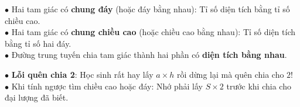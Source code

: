 \documentclass[14pt,a4paper,oneside]{extbook}
\begin{document}
\noindent
\begin{minipage}[t]{0.54\textwidth}
  \begin{tcolorbox}[
    enhanced,
    title={\footnotesize\bfseries\color{white}\faBolt\ Tính chất tỉ số diện tích tam giác},
    colback=green!3!white,
    colframe=green!60!black,
    arc=2.5mm, boxrule=0.8pt, top=1.8mm, bottom=1.8mm, left=2.2mm, right=2.2mm
  ]
    \footnotesize
    $\bullet$ Hai tam giác có \textbf{chung đáy} (hoặc đáy bằng nhau): Tỉ số diện tích bằng tỉ số chiều cao.\\
    $\bullet$ Hai tam giác có \textbf{chung chiều cao} (hoặc chiều cao bằng nhau): Tỉ số diện tích bằng tỉ số hai đáy.\\
    $\bullet$ Đường trung tuyến chia tam giác thành hai phần có \textbf{diện tích bằng nhau}.
  \end{tcolorbox}
\end{minipage}%
\hfill
\begin{minipage}[t]{0.44\textwidth}
  \begin{tcolorbox}[
    enhanced,
    title={\footnotesize\bfseries\color{white}\faExclamationTriangle\ Mẹo tránh bẫy trắc nghiệm},
    colback=red!2!white,
    colframe=red!70!black,
    arc=2.5mm, boxrule=0.8pt, top=1.8mm, bottom=1.8mm, left=2.2mm, right=2.2mm
  ]
    \footnotesize
    $\bullet$ \textbf{Lỗi quên chia 2}: Học sinh rất hay lấy $a \times h$ rồi dừng lại mà quên chia cho $2$!\\
    $\bullet$ Khi tính ngược tìm chiều cao hoặc đáy: Nhớ phải lấy \textbf{$S \times 2$} trước khi chia cho đại lượng đã biết.
  \end{tcolorbox}
\end{minipage}
\end{document}
